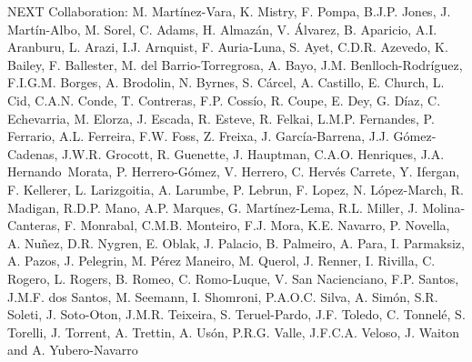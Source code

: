NEXT Collaboration: M. Mart\'inez-Vara, K. Mistry, F. Pompa, B.J.P. Jones, J. Mart\'in-Albo, M. Sorel, C. Adams, H. Almaz\'an, V. \'Alvarez, B. Aparicio, A.I. Aranburu, L. Arazi, I.J. Arnquist, F. Auria-Luna, S. Ayet, C.D.R. Azevedo, K. Bailey, F. Ballester, M. del Barrio-Torregrosa, A. Bayo, J.M. Benlloch-Rodr\'{i}guez, F.I.G.M. Borges, A. Brodolin, N. Byrnes, S. C\'arcel, A. Castillo, E. Church, L. Cid, C.A.N. Conde, T. Contreras, F.P. Coss\'io, R. Coupe, E. Dey, G. D\'iaz, C. Echevarria, M. Elorza, J. Escada, R. Esteve, R. Felkai, L.M.P. Fernandes, P. Ferrario, A.L. Ferreira, F.W. Foss, Z. Freixa, J. Garc\'ia-Barrena, J.J. G\'omez-Cadenas, J.W.R. Grocott, R. Guenette, J. Hauptman, C.A.O. Henriques, J.A. Hernando~Morata, P. Herrero-G\'omez, V. Herrero, C. Herv\'es Carrete, Y. Ifergan, F. Kellerer, L. Larizgoitia, A. Larumbe, P. Lebrun, F. Lopez, N. L\'opez-March, R. Madigan, R.D.P. Mano, A.P. Marques, G. Mart\'inez-Lema, R.L. Miller, J. Molina-Canteras, F. Monrabal, C.M.B. Monteiro, F.J. Mora, K.E. Navarro, P. Novella, A. Nu\~{n}ez, D.R. Nygren, E. Oblak, J. Palacio, B. Palmeiro, A. Para, I. Parmaksiz, A. Pazos, J. Pelegrin, M. P\'erez Maneiro, M. Querol, J. Renner, I. Rivilla, C. Rogero, L. Rogers, B. Romeo, C. Romo-Luque, V. San Nacienciano, F.P. Santos, J.M.F. dos Santos, M. Seemann, I. Shomroni, P.A.O.C. Silva, A. Sim\'on, S.R. Soleti, J. Soto-Oton, J.M.R. Teixeira, S. Teruel-Pardo, J.F. Toledo, C. Tonnel\'e, S. Torelli, J. Torrent, A. Trettin, A. Us\'on, P.R.G. Valle, J.F.C.A. Veloso, J. Waiton and A. Yubero-Navarro